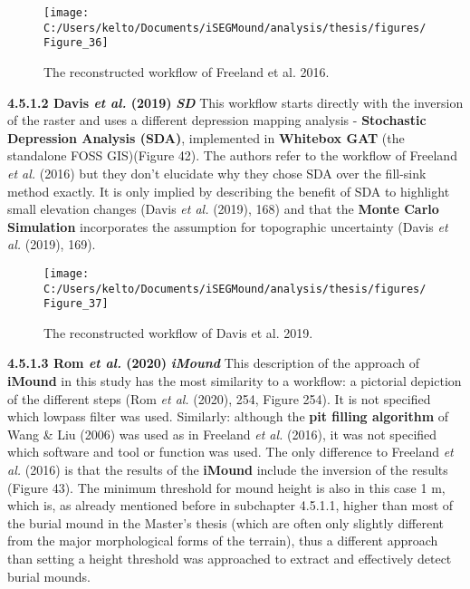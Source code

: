 \documentclass[
  12pt,
]{article}
\begin{document}
\begin{figure}

{\centering \texttt{[image: C:/Users/kelto/Documents/iSEGMound/analysis/thesis/figures/Figure\_36]} 

}

\caption{The reconstructed workflow of Freeland et al. 2016.}\label{fig:Figure36}
\end{figure}

\textbf{4.5.1.2 Davis \emph{et al.} (2019)} \textbf{\emph{SD}}
\newline
This workflow starts directly with the inversion of the raster and uses a different depression mapping analysis - \textbf{Stochastic Depression Analysis (SDA)}, implemented in \textbf{Whitebox GAT} (the standalone FOSS GIS)(Figure 42). The authors refer to the workflow of Freeland \emph{et al.} (2016) but they don't elucidate why they chose SDA over the fill-sink method exactly. It is only implied by describing the benefit of SDA to highlight small elevation changes (Davis \emph{et al.} (2019), 168) and that the \textbf{Monte Carlo Simulation} incorporates the assumption for topographic uncertainty (Davis \emph{et al.} (2019), 169).

\begin{figure}

{\centering \texttt{[image: C:/Users/kelto/Documents/iSEGMound/analysis/thesis/figures/Figure\_37]} 

}

\caption{The reconstructed workflow of Davis et al. 2019.}\label{fig:Figure37}
\end{figure}

\textbf{4.5.1.3 Rom \emph{et al.} (2020)} \textbf{\emph{iMound}}
\newline
This description of the approach of \textbf{iMound} in this study has the most similarity to a workflow: a pictorial depiction of the different steps (Rom \emph{et al.} (2020), 254, Figure 254). It is not specified which lowpass filter was used. Similarly: although the \textbf{pit filling algorithm} of Wang \& Liu (2006) was used as in Freeland \emph{et al.} (2016), it was not specified which software and tool or function was used. The only difference to Freeland \emph{et al.} (2016) is that the results of the \textbf{iMound} include the inversion of the results (Figure 43). The minimum threshold for mound height is also in this case 1 m, which is, as already mentioned before in subchapter 4.5.1.1, higher than most of the burial mound in the Master's thesis (which are often only slightly different from the major morphological forms of the terrain), thus a different approach than setting a height threshold was approached to extract and effectively detect burial mounds.
\end{document}
